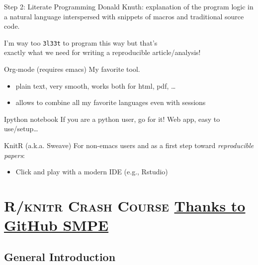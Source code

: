 \documentclass[11pt,xcolor=dvipsnames]{beamer}
\begin{document}
\begin{frame}[fragile,label=sec-3-2-5]{Step 2: Literate Programming}
 \small
\alert{Donald Knuth}: explanation of the program logic in a \alert{natural language}
\alert{interspersed with snippets of} macros and traditional \alert{source code}.

\begin{center}
I'm way too \texttt{3l33t} to program this way but that's \\
\alert{exactly what we need for writing a reproducible article/analysis!}
\end{center}
\vspace{-.5em}

\begin{block}{Org-mode (requires emacs)}
My favorite tool.
\begin{itemize}
\item plain text, very smooth, works both for html, pdf, \ldots{}
\item allows to combine all my favorite languages even with sessions
\end{itemize}
\end{block}
\begin{block}{Ipython notebook}
If you are a python user, go for it! Web app, easy to use/setup\ldots{}
\end{block}
\begin{block}{KnitR (a.k.a. Sweave)}
For non-emacs users and as a first step toward \emph{reproducible papers}:
\begin{itemize}
\item Click and play with a modern IDE (e.g., Rstudio)
\end{itemize}
\end{block}
\end{frame}
\section[{\scshape R/knitr Crash Course}]{{\scshape R/knitr Crash Course} \href{https://github.com/alegrand/SMPE}{Thanks to GitHub SMPE} }
\label{sec-4}
\subsection{General Introduction}
\label{sec-4-1}
\end{document}
